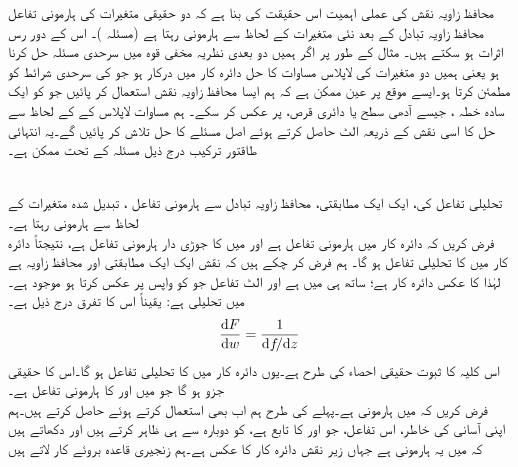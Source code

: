 محافظ زاویہ نقش کی عملی اہمیت اس حقیقت کی بنا ہے کہ دو حقیقی متغیرات کی ہارمونی تفاعل محافظ زاویہ تبادل کے بعد نئی متغیرات کے لحاظ سے ہارمونی رہتا ہے (مسئلہ )۔ اس کے دور رس اثرات  ہو سکتے ہیں۔ مثال کے طور پر اگر ہمیں دو بعدی نظریہ مخفی قوہ میں سرحدی مسئلہ حل کرنا ہو یعنی ہمیں دو متغیرات کی لاپلاس مساوات کا حل دائرہ کار  میں درکار ہو جو  کی سرحدی شرائط کو مطمئن کرتا ہو۔ایسے موقع پر عین ممکن ہے کہ ہم ایسا محافظ زاویہ نقش استعمال کر پائیں جو  کو ایک سادہ خطہ ، جیسے آدھی سطح یا دائری قرص، پر عکس کر سکے۔ ہم مساوات لاپلاس کے  کے لحاظ سے حل کا اسی نقش کے ذریعہ الٹ حاصل کرتے ہوئے اصل مسئلے کا حل تلاش کر پائیں گے۔یہ انتہائی طاقتور ترکیب درج ذیل مسئلہ کے تحت ممکن ہے۔

\quad {}\\
تحلیلی تفاعل  کی، ایک ایک مطابقتی، محافظ زاویہ تبادل  سے  ہارمونی تفاعل ،  تبدیل شدہ متغیرات کے لحاظ سے ہارمونی رہتا ہے۔ 
\quad {}\\
فرض کریں کہ دائرہ کار  میں ہارمونی تفاعل  ہے  اور  میں  کا جوڑی دار ہارمونی تفاعل  ہے، نتیجتاً  دائرہ کار  میں  کا تحلیلی تفاعل  ہو گا۔ ہم فرض کر چکے ہیں کہ نقش  ایک ایک مطابقتی اور محافظ زاویہ ہے لہٰذا  کا عکس  دائرہ کار ہے؛ ساتھ ہی  میں  ہے اور الٹ تفاعل  جو  کو واپس  پر عکس کرتا ہو موجود ہے۔ میں  تحلیلی ہے: یقیناً اس کا  تفرق درج ذیل ہے۔
\begin{align*}
\frac{\dif F}{\dif w}=\frac{1}{\dif f\!/\!\dif z}
\end{align*}
اس کلیہ کا ثبوت حقیقی احصاء کی طرح ہے۔یوں  دائرہ کار  میں  کا تحلیلی تفاعل ہو گا۔اس کا حقیقی جزو  ہو گا جو  میں  اور  کا ہارمونی تفاعل ہے۔ 
\quad {}\\
فرض کریں کہ  میں  ہارمونی ہے۔پہلے کی طرح ہم اب بھی  استعمال کرتے  ہوئے  حاصل کرتے ہیں۔ہم اپنی  آسانی کی خاطر، اس تفاعل، جو  اور  کا تابع ہے، کو دوبارہ  سے ہی ظاہر کرتے ہیں اور دکھاتے ہیں کہ  میں یہ ہارمونی ہے جہاں   زیر نقش  دائرہ کار  کا عکس ہے۔ہم زنجیری قاعدہ بروئے کار لاتے ہیں
